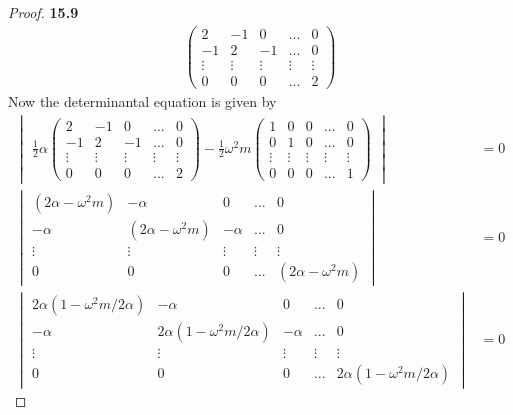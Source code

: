 \documentclass[11pt]{article}
\theoremstyle{definition}
\begin{document}
\begin{proof}{\textbf{15.9}}
\begin{align*}
\begin{pmatrix}
            2  & -1 & 0 &... & 0\\
            -1 & 2 & -1 &... & 0\\
            \vdots & \vdots & \vdots & \vdots & \vdots\\
            0 & 0 & 0 &... & 2          
        \end{pmatrix}
    \end{align*}
    Now the determinantal equation is given by
    \begin{align*}
        \begin{vmatrix}
            \frac{1}{2}\alpha\begin{pmatrix}
                2  & -1 & 0 &... & 0\\
                -1 & 2 & -1 &... & 0\\
                \vdots & \vdots & \vdots & \vdots & \vdots\\
                0 & 0 & 0 &... & 2    
            \end{pmatrix}
            - \frac{1}{2}\omega^2m\begin{pmatrix}
                1  & 0 & 0 &... & 0\\
                0 & 1 & 0 &... & 0\\
                \vdots & \vdots & \vdots & \vdots & \vdots\\
                0 & 0 & 0 &... & 1
            \end{pmatrix}
        \end{vmatrix} &= 0\\
        \begin{vmatrix}
                (2\alpha - \omega^2m)  & -\alpha & 0 &... & 0\\
                -\alpha & (2\alpha - \omega^2m) & -\alpha &... & 0\\
                \vdots & \vdots & \vdots & \vdots & \vdots\\
                0 & 0 & 0 & ... & (2\alpha - \omega^2m)
        \end{vmatrix} &= 0\\
        \begin{vmatrix}
            2\alpha(1 - \omega^2m/2\alpha)  & -\alpha & 0 &... & 0\\
            -\alpha & 2\alpha(1 - \omega^2m/2\alpha) & -\alpha &... & 0\\
            \vdots & \vdots & \vdots & \vdots & \vdots\\
            0 & 0 & 0 &... & 2\alpha(1 - \omega^2m/2\alpha)
    \end{vmatrix} &= 0

\end{align*}
\end{proof}
\end{document}
